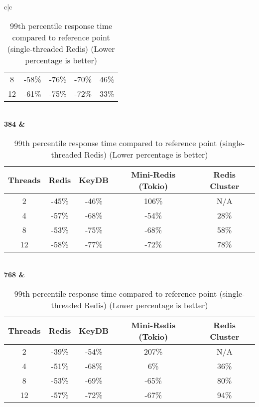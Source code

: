 \begin{center}
\begin{table}
\begin{tabular}{c|c}
\begin{tabular}{c|cccc}
                8 &  -58\% &  -76\% &               -70\% &           46\% \\
               12 &  -61\% &  -75\% &               -72\% &           33\% \\
                \bottomrule
            \end{tabular} \\
            \bf{384} & \begin{tabular}{c|cccc}
                \toprule
                Threads & Redis & KeyDB & Mini-Redis (Tokio) & Redis Cluster \\
                \midrule
                2 &  -45\% &  -46\% &               106\% &           N/A \\
                4 &  -57\% &  -68\% &               -54\% &           28\% \\
                8 &  -53\% &  -75\% &               -68\% &           58\% \\
               12 &  -58\% &  -77\% &               -72\% &           78\% \\
                \bottomrule
            \end{tabular} \\
            \bf{768} & \begin{tabular}{c|cccc}
                \toprule
                Threads & Redis & KeyDB & Mini-Redis (Tokio) & Redis Cluster \\
                \midrule
                2 &  -39\% &  -54\% &               207\% &           N/A \\
                4 &  -51\% &  -68\% &                 6\% &           36\% \\
                8 &  -53\% &  -69\% &               -65\% &           80\% \\
               12 &  -57\% &  -72\% &               -67\% &           94\% \\
                \bottomrule
            \end{tabular} \\
            \bottomrule
        \end{tabular}
        \caption{99th percentile response time compared to reference point (single-threaded Redis) (Lower percentage is better)}
        \label{tbl:table_of_figures_99_response_times}
    \end{table}
\end{center}

